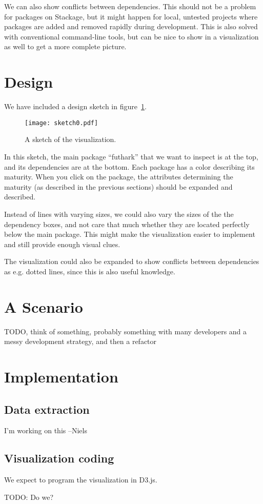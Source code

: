 \documentclass[a4paper,12pt]{article}
\begin{document}
We can also show conflicts between dependencies.  This should not be a problem
for packages on Stackage, but it might happen for local, untested projects where
packages are added and removed rapidly during development.  This is also solved
with conventional command-line tools, but can be nice to show in a visualization
as well to get a more complete picture.


\section{Design}

We have included a design sketch in figure~\ref{fig:sketch0}.

\begin{figure}[h!]
\begin{center}
\texttt{[image: sketch0.pdf]}
\caption{A sketch of the visualization.}
\label{fig:sketch0}
\end{center}
\end{figure}

In this sketch, the main package ``futhark'' that we want to inspect is at the
top, and its dependencies are at the bottom.  Each package has a color
describing its maturity.  When you click on the package, the attributes
determining the maturity (as described in the previous sections) should be
expanded and described.

Instead of lines with varying sizes, we could also vary the sizes of the the
dependency boxes, and not care that much whether they are located perfectly
below the main package.  This might make the visualization easier to implement
and still provide enough visual clues.

The visualization could also be expanded to show conflicts between dependencies
as e.g. dotted lines, since this is also useful knowledge.


\section{A Scenario}

TODO, think of something, probably something with many developers and a messy
development strategy, and then a refactor


\section{Implementation}

\subsection{Data extraction}

I'm working on this --Niels

\subsection{Visualization coding}

We expect to program the visualization in D3.js.

TODO: Do we?
\end{document}
